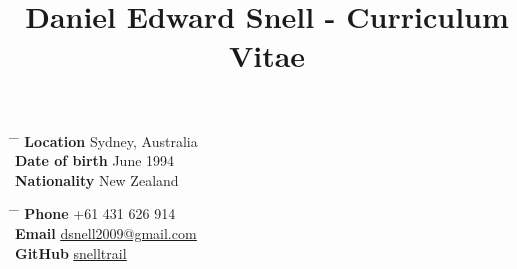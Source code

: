 \documentclass[hidelinks, 10pt]{article} %
\begin{document}

\title{Daniel Edward Snell - Curriculum Vitae} %


\parbox{0.5\textwidth}{ %
    \begin{tabbing} %
        \hspace{3cm} \= \hspace{4cm} \= \kill %
        {\bf Location} \> Sydney, Australia\\
        {\bf Date of birth}  June 1994 \\ %
        {\bf Nationality} \> New Zealand %
    \end{tabbing}}
\hfill %
\parbox{0.5\textwidth}{ %
    \begin{tabbing} %
        \hspace{3cm} \= \hspace{4cm} \= \kill %
        {\bf Phone} \> +61 431 626 914 \\ %
        {\bf Email} \> \href{mailto:dsnell2009@gmail.com}{\underline{dsnell2009@gmail.com}} \\ %
        {\bf GitHub} \> \href{https://github.com/snelltrail}{\underline{snelltrail}} \\
    \end{tabbing}}


%
\end{document}
